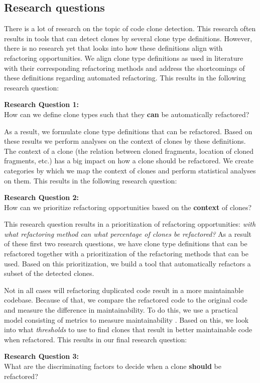 \subsection{Research questions}
There is a lot of research on the topic of code clone detection. This research often results in tools that can detect clones by several clone type definitions. However, there is no research yet that looks into how these definitions align with refactoring opportunities. We align clone type definitions as used in literature \cite{roy2007survey} with their corresponding refactoring methods \cite{fowler2018refactoring} and address the shortcomings of these definitions regarding automated refactoring. This results in the following research question:
\begin{displayquote}
\textbf{Research Question 1:}\\How can we define clone types such that they \textbf{can} be automatically refactored?
\end{displayquote}
As a result, we formulate clone type definitions that can be refactored. Based on these results we perform analyses on the context of clones by these definitions. The context of a clone (the relation between cloned fragments, location of cloned fragments, etc.) has a big impact on how a clone should be refactored. We create categories by which we map the context of clones and perform statistical analyses on them. This results in the following research question:
\begin{displayquote}
\textbf{Research Question 2:}\\How can we prioritize refactoring opportunities based on the \textbf{context} of clones?
\end{displayquote}
This research question results in a prioritization of refactoring opportunities: \textit{with what refactoring method can what percentage of clones be refactored?} As a result of these first two research questions, we have clone type definitions that can be refactored together with a prioritization of the refactoring methods that can be used. Based on this prioritization, we build a tool that automatically refactors a subset of the detected clones.

Not in all cases will refactoring duplicated code result in a more maintainable codebase. Because of that, we compare the refactored code to the original code and measure the difference in maintainability. To do this, we use a practical model consisting of metrics to measure maintainability \cite{heitlager2007practical}. Based on this, we look into what \textit{thresholds} to use to find clones that result in better maintainable code when refactored. This results in our final research question:
\begin{displayquote}
\textbf{Research Question 3:}\\What are the discriminating factors to decide when a clone \textbf{should} be refactored?
\end{displayquote}

